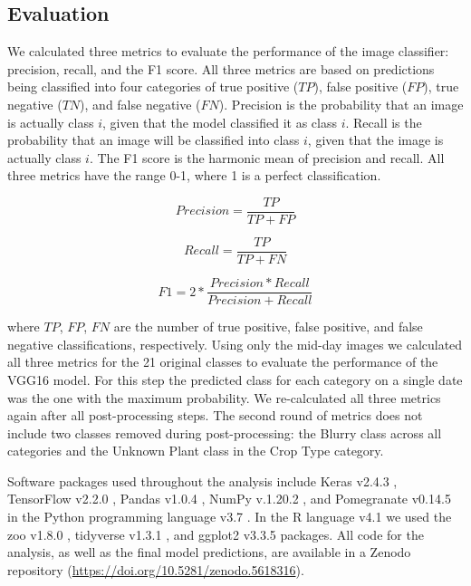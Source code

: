 \documentclass[remotesensing,article,submit,moreauthors,pdftex]{Definitions/mdpi}
\begin{document}
\subsection{Evaluation}

We calculated three metrics to evaluate the performance of the image classifier: precision, recall, and the F1 score. All three metrics are based on predictions being classified into four categories of true positive ($TP$), false positive ($FP$), true negative ($TN$), and false negative ($FN$). Precision is the probability that an image is actually class $i$, given that the model classified it as class $i$. Recall is the probability that an image will be classified into class $i$, given that the image is actually class $i$. The F1 score is the harmonic mean of precision and recall. All three metrics have the range 0-1, where 1 is a perfect classification. 

\begin{equation}
Precision = \frac{TP}{TP+FP}
\end{equation}

\begin{equation}
Recall = \frac{TP}{TP+FN}
\end{equation}

\begin{equation}
F1 = 2*\frac{Precision*Recall}{Precision+Recall}
\end{equation}

where $TP$, $FP$, $FN$ are the number of true positive, false positive, and false negative classifications, respectively. Using only the mid-day images we calculated all three metrics for the 21 original classes to evaluate the performance of the VGG16 model. For this step the predicted class for each category on a single date was the one with the maximum probability. We re-calculated all three metrics again after all post-processing steps. The second round of metrics does not include two classes removed during post-processing: the Blurry class across all categories and the Unknown Plant class in the Crop Type category. 

Software packages used throughout the analysis include Keras v2.4.3 \citep{chollet2018-keras}, TensorFlow v2.2.0 \citep{abadi2015-tensorflow}, Pandas v1.0.4 \citep{mckinney2010-pandas}, NumPy v.1.20.2 \citep{harris2020-numpy}, and Pomegranate v0.14.5 \citep{schreiber2018-pomegranate} in the Python programming language v3.7 \citep{python2003}. In the R language v4.1 \citep{rcitation} we used the zoo v1.8.0 \citep{zeileis2005-zoo}, tidyverse v1.3.1 \citep{wickham2019-tidyverse}, and ggplot2 v3.3.5 \citep{wickham2016-ggplot2} packages. All code for the analysis, as well as the final model predictions, are available in a Zenodo repository (\href{https://doi.org/10.5281/zenodo.5618316}{https://doi.org/10.5281/zenodo.5618316}).
\end{document}
